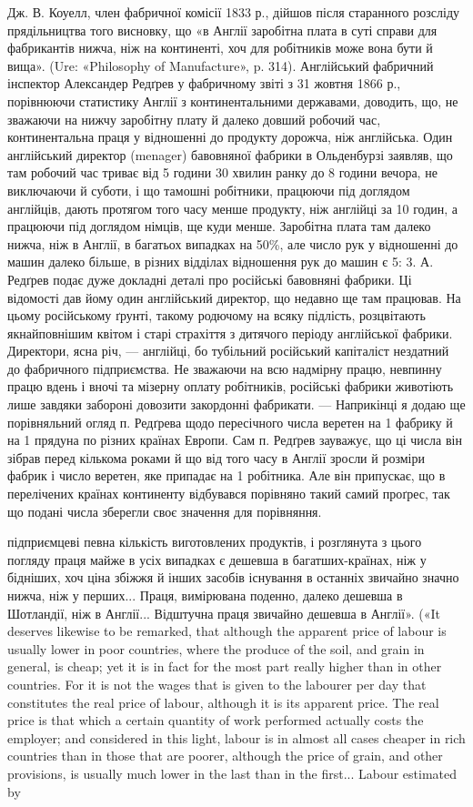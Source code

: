 Дж. В. Коуелл, член фабричної комісії 1833 р., дійшов після
старанного розсліду прядільництва того висновку, що «в Англії
заробітна плата в суті справи для фабрикантів нижча, ніж на
континенті, хоч для робітників може вона бути й вища». (Ure:
«Philosophy of Manufacture», p. 314). Англійський фабричний
інспектор Александер Редґрев у фабричному звіті з 31 жовтня
1866 р., порівнюючи статистику Англії з континентальними державами,
доводить, що, не зважаючи на нижчу заробітну плату
й далеко довший робочий час, континентальна праця у відношенні
до продукту дорожча, ніж англійська. Один англійський
директор (menager) бавовняної фабрики в Ольденбурзі заявляв,
що там робочий час триває від 5 години 30 хвилин ранку до
8 години вечора, не виключаючи й суботи, і що тамошні робітники,
працюючи під доглядом англійців, дають протягом того часу
менше продукту, ніж англійці за 10 годин, а працюючи під
доглядом німців, ще куди менше. Заробітна плата там далеко
нижча, ніж в Англії, в багатьох випадках на 50\%, але число
рук у відношенні до машин далеко більше, в різних відділах
відношення рук до машин є 5: 3. А. Редґрев подає дуже докладні
деталі про російські бавовняні фабрики. Ці відомості дав йому
один англійський директор, що недавно ще там працював. На
цьому російському ґрунті, такому родючому на всяку підлість,
розцвітають якнайповнішим квітом і старі страхіття з дитячого
періоду англійської фабрики. Директори, ясна річ, — англійці,
бо тубільний російський капіталіст нездатний до фабричного
підприємства. Не зважаючи на всю надмірну працю, невпинну
працю вдень і вночі та мізерну оплату робітників, російські фабрики
животіють лише завдяки забороні довозити закордонні фабрикати.
— Наприкінці я додаю ще порівняльний огляд п. Редґрева
щодо пересічного числа веретен на 1 фабрику й на 1 прядуна
по різних країнах Европи. Сам п. Редґрев зауважує, що ці
числа він зібрав перед кількома роками й що від того часу в Англії
зросли й розміри фабрик і число веретен, яке припадає на 1 робітника.
Але він припускає, що в перелічених країнах континенту
відбувався порівняно такий самий проґрес, так що подані
числа зберегли своє значення для порівняння.

підприємцеві певна кількість виготовлених продуктів, і розглянута з
цього погляду праця майже в усіх випадках є дешевша в багатших-країнах,
ніж у бідніших, хоч ціна збіжжя й інших засобів існування в останніх
звичайно значно нижча, ніж у перших... Праця, вимірювана поденно,
далеко дешевша в Шотландії, ніж в Англії... Відштучна праця звичайно
дешевша в Англії». («It deserves likewise to be remarked, that although the
apparent price of labour is usually lower in poor countries, where the
produce of the soil, and grain in general, is cheap; yet it is in fact for the
most part really higher than in other countries. For it is not the wages that
is given to the labourer per day that constitutes the real price of labour,
although it is its apparent price. The real price is that which a certain
quantity of work performed actually costs the employer; and considered
in this light, labour is in almost all cases cheaper in rich countries than in
those that are poorer, although the price of grain, and other provisions, is
usually much lower in the last than in the first... Labour estimated by

